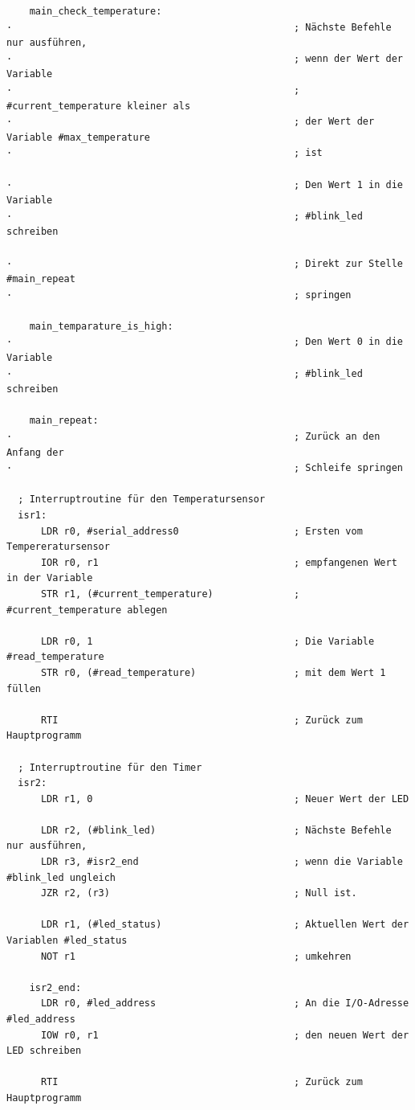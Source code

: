 {\begin{verbatim}
    main_check_temperature:
·                                                 ; Nächste Befehle nur ausführen,
·                                                 ; wenn der Wert der Variable
·                                                 ; #current_temperature kleiner als
·                                                 ; der Wert der Variable #max_temperature
·                                                 ; ist

·                                                 ; Den Wert 1 in die Variable
·                                                 ; #blink_led schreiben

·                                                 ; Direkt zur Stelle #main_repeat
·                                                 ; springen

    main_temparature_is_high:
·                                                 ; Den Wert 0 in die Variable
·                                                 ; #blink_led schreiben

    main_repeat:
·                                                 ; Zurück an den Anfang der
·                                                 ; Schleife springen

  ; Interruptroutine für den Temperatursensor
  isr1:
      LDR r0, #serial_address0                    ; Ersten vom Tempereratursensor
      IOR r0, r1                                  ; empfangenen Wert in der Variable
      STR r1, (#current_temperature)              ; #current_temperature ablegen

      LDR r0, 1                                   ; Die Variable #read_temperature
      STR r0, (#read_temperature)                 ; mit dem Wert 1 füllen

      RTI                                         ; Zurück zum Hauptprogramm

  ; Interruptroutine für den Timer
  isr2:
      LDR r1, 0                                   ; Neuer Wert der LED

      LDR r2, (#blink_led)                        ; Nächste Befehle nur ausführen,
      LDR r3, #isr2_end                           ; wenn die Variable #blink_led ungleich
      JZR r2, (r3)                                ; Null ist.

      LDR r1, (#led_status)                       ; Aktuellen Wert der Variablen #led_status
      NOT r1                                      ; umkehren

    isr2_end:
      LDR r0, #led_address                        ; An die I/O-Adresse #led_address
      IOW r0, r1                                  ; den neuen Wert der LED schreiben

      RTI                                         ; Zurück zum Hauptprogramm
\end{verbatim}
}



